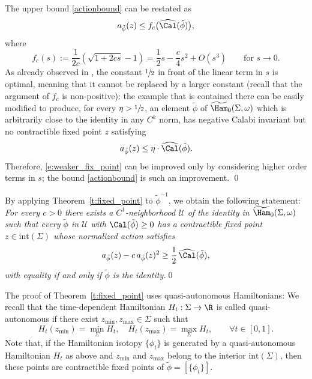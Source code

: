 \begin{rem}
The upper bound \eqref{actionbound} can be restated as
\[
a_{\tilde{\phi}}(z) \leq f_c \bigl( \widehat{\Cal}(\tilde{\phi}) \bigr),
\]
where
\[
f_c(s) := \frac{1}{2c} \left( \sqrt{1+2cs} - 1 \right) = \frac{1}{2} s - \frac{c}{4} s^2 + O(s^3) \qquad \mbox{for } s\to 0.
\]
As already observed in \cite[Rem.\,2.21]{Abbondandolo:2018fb}, the constant $\sfrac{1}{2}$ in front of the linear term in $s$ is optimal, meaning that it cannot be replaced by a larger constant (recall that the argument of $f_c$ is non-positive): the example that is contained there can be easily modified to produce, for every $\eta> \sfrac{1}{2}$, an element $\tilde{\phi}$ of $\widetilde{\Ham}_0(\Sigma,\omega)$ which is arbitrarily close to the identity in any $C^k$ norm, has negative Calabi invariant but no contractible fixed point $z$ satisfying
\[
a_{\tilde{\phi}}(z) \leq \eta \cdot \widehat{\Cal}(\tilde{\phi}).
\]
Therefore, \eqref{e:weaker_fix_point} can be improved only by considering higher order terms in $s$; the bound \eqref{actionbound} is such an improvement.
\hfill\qed
\end{rem}

\begin{rem}
By applying Theorem~\ref{t:fixed_point} to $\tilde{\phi}^{-1}$, we obtain the following statement:
\emph{For every $c> 0$ there exists a $C^1$-neighborhood $\mathcal{U}$ of the identity in $\widetilde{\Ham}_0(\Sigma,\omega)$ such that every $\tilde{\phi}$ in $\mathcal{U}$ with $\Cal(\tilde{\phi})\geq 0$ has a contractible fixed point $z\in \mathrm{int}(\Sigma)$ whose normalized action satisfies}
\begin{equation*}
a_{\tilde{\phi}}(z) - c\, a_{\tilde{\phi}}(z)^2 \geq \frac{1}{2} \, \widehat{\Cal}(\tilde{\phi}),
\end{equation*}
\emph{with equality if and only if $\tilde{\phi}$ is the identity.}\hfill\qed
\end{rem}

The proof of Theorem~\ref{t:fixed_point} uses quasi-autonomous Hamiltonians: We recall that the time-dependent Hamiltonian $H_t:\Sigma\to\R$ is called quasi-autonomous if there exist $z_{\min},z_{\max}\in\Sigma$ such that
\[
H_t(z_{\min})=\min_{\Sigma} H_t, \quad H_t(z_{\max})=\max_{\Sigma} H_t, \qquad \forall t\in [0,1].
\]
Note that, if the Hamiltonian isotopy $\{\phi_t\}$ is generated by a quasi-autonomous Hamiltonian $H_t$ as above and $z_{\min}$ and $z_{\max}$ belong to the interior $\mathrm{int}(\Sigma)$, then these points are contractible fixed points of $\tilde{\phi}=[\{\phi_t\}]$.

